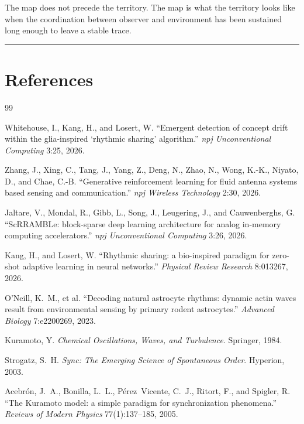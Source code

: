 \documentclass[11pt, a4paper]{article}
\theoremstyle{definition}
\theoremstyle{remark}
\begin{document}
The map does not precede the territory. The map is what the territory looks
like when the coordination between observer and environment has been
sustained long enough to leave a stable trace.

\bigskip
\noindent\rule{0.4\textwidth}{0.4pt}

\vspace{0.5em}

\section*{References}

\begin{thebibliography}{99}

Whitehouse, I., Kang, H., and Losert, W.
``Emergent detection of concept drift within the glia-inspired `rhythmic
sharing' algorithm.''
\textit{npj Unconventional Computing} 3:25, 2026.

Zhang, J., Xing, C., Tang, J., Yang, Z., Deng, N., Zhao, N., Wong, K.-K.,
Niyato, D., and Chae, C.-B.
``Generative reinforcement learning for fluid antenna systems based sensing
and communication.''
\textit{npj Wireless Technology} 2:30, 2026.

Jaltare, V., Mondal, R., Gibb, L., Song, J., Leugering, J., and
Cauwenberghs, G.
``ScRRAMBLe: block-sparse deep learning architecture for analog in-memory
computing accelerators.''
\textit{npj Unconventional Computing} 3:26, 2026.

Kang, H., and Losert, W.
``Rhythmic sharing: a bio-inspired paradigm for zero-shot adaptive learning
in neural networks.''
\textit{Physical Review Research} 8:013267, 2026.

O'Neill, K.~M., et al.
``Decoding natural astrocyte rhythms: dynamic actin waves result from
environmental sensing by primary rodent astrocytes.''
\textit{Advanced Biology} 7:e2200269, 2023.

Kuramoto, Y.
\textit{Chemical Oscillations, Waves, and Turbulence}.
Springer, 1984.

Strogatz, S.~H.
\textit{Sync: The Emerging Science of Spontaneous Order}.
Hyperion, 2003.

Acebr\'{o}n, J.~A., Bonilla, L.~L., P\'{e}rez~Vicente, C.~J.,
Ritort, F., and Spigler, R.
``The Kuramoto model: a simple paradigm for synchronization phenomena.''
\textit{Reviews of Modern Physics} 77(1):137--185, 2005.


\end{thebibliography}
\end{document}
